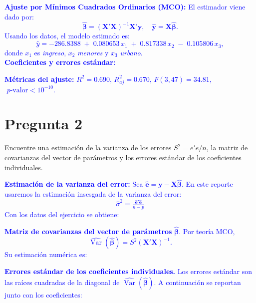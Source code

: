\documentclass[10pt]{article}
\begin{document}
    \textcolor{blue}{
        \textbf{Ajuste por Mínimos Cuadrados Ordinarios (MCO):} El estimador viene dado por:
        \[
        \hat{\boldsymbol{\beta}}=(\mathbf{X}'\mathbf{X})^{-1}\mathbf{X}'\mathbf{y},\quad \hat{\mathbf{y}}=\mathbf{X}\hat{\boldsymbol{\beta}}.
        \]
        Usando los datos, el modelo estimado es:
        \[
        \widehat{y}= -286.8388\; +\; 0.080653\, x_1\; +\; 0.817338\, x_2\; -\; 0.105806\, x_3,
        \]
        \noindent donde $x_1$ es \emph{ingreso}, $x_2$ \emph{menores} y $x_3$ \emph{urbano}. \\
        \noindent \textbf{Coeficientes y errores estándar:}
        
        \noindent \textbf{Métricas del ajuste:} $R^2=0.690$, $R^2_{aj}=0.670$, $F(3,47)=34.81$, $\,\,p\text{-valor}<10^{-10}$.\\
        
    }
\section{Pregunta 2}
Encuentre una estimación de la varianza de los errores $S^2 = e'e/n$, la matriz de covarianzas del vector de parámetros y los errores estándar de los coeficientes individuales. \\

\textcolor{blue}{
    \textbf{Estimación de la varianza del error:}
    Sea $\hat{\mathbf e}=\mathbf y-\mathbf X\hat{\boldsymbol\beta}$. En este reporte usaremos la estimación insesgada de la varianza del error:
    \[
        \widehat{\sigma}^2 = \tfrac{\hat{\mathbf e}'\hat{\mathbf e}}{n-p}
    \]
    Con los datos del ejercicio se obtiene:
    
    \textbf{Matriz de covarianzas del vector de parámetros} $\hat{\boldsymbol\beta}$.
    Por teoría MCO,
    \[
        \widehat{\operatorname{Var}}(\hat{\boldsymbol\beta}) = S^2 (\mathbf X'\mathbf X)^{-1}.
    \]
    Su estimación numérica es:
    
    \textbf{Errores estándar de los coeficientes individuales.}
    Los errores estándar son las raíces cuadradas de la diagonal de $\widehat{\operatorname{Var}}(\hat{\boldsymbol\beta})$. A continuación se reportan junto con los coeficientes:
    
}
\end{document}
